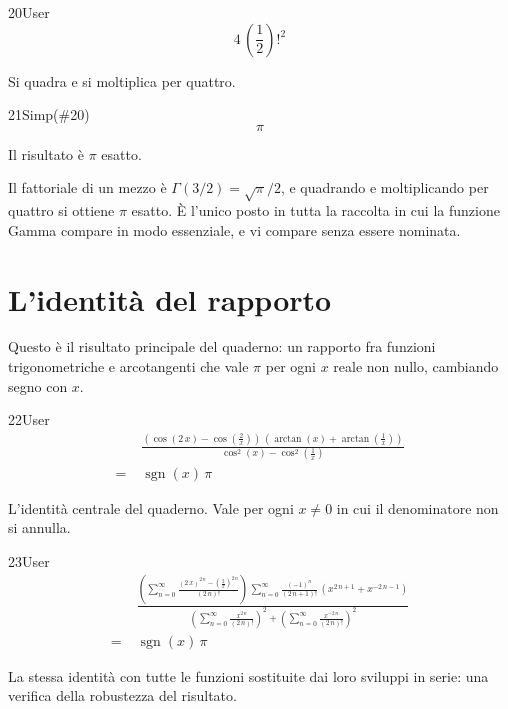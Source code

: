 \begin{espr}{20}{User}{}
\[
4\, \left(\frac{1}{2}\right)!^{2}
\]
\end{espr}
Si quadra e si moltiplica per quattro.

\begin{espr}{21}{Simp(\#20)}{}
\[
\pi
\]
\end{espr}
Il risultato è $\pi$ esatto.


Il fattoriale di un mezzo è $\Gamma(3/2)=\sqrt{\pi}/2$, e quadrando e moltiplicando per quattro si ottiene $\pi$ esatto. È l'unico posto in tutta la raccolta in cui la funzione Gamma compare in modo essenziale, e vi compare senza essere nominata.

\section{L'identità del rapporto}

Questo è il risultato principale del quaderno: un rapporto fra funzioni trigonometriche e arcotangenti che vale $\pi$ per ogni $x$ reale non nullo, cambiando segno con $x$.

\begin{espr}{22}{User}{}
\begin{align*}
& \frac{\left(\cos\!\left(2\, x\right) - \cos\!\left(\frac{2}{x}\right)\right)\, \left(\arctan\!\left(x\right) + \arctan\!\left(\frac{1}{x}\right)\right)}{\cos^{2}\!\left(x\right) - \cos^{2}\!\left(\frac{1}{x}\right)} \\
=\;& \operatorname{sgn}\!\left(x\right)\, \pi
\end{align*}
\end{espr}
L'identità centrale del quaderno. Vale per ogni $x\neq0$ in cui il denominatore non si annulla.

\begin{espr}{23}{User}{}
\begin{align*}
& \frac{\left(\sum_{n=0}^{\infty} \frac{\left(2\, x\right)^{2\, n} - \left(\frac{2}{x}\right)^{2\, n}}{\left(2\, n\right)!}\right)\, \sum_{n=0}^{\infty} \frac{\left(-1\right)^{n}}{\left(2\, n + 1\right)!}\, \left(x^{2\, n + 1} + x^{-2\, n - 1}\right)}{\left(\sum_{n=0}^{\infty} \frac{x^{2\, n}}{\left(2\, n\right)!}\right)^{2} + \left(\sum_{n=0}^{\infty} \frac{x^{-2\, n}}{\left(2\, n\right)!}\right)^{2}} \\
=\;& \operatorname{sgn}\!\left(x\right)\, \pi
\end{align*}
\end{espr}
La stessa identità con tutte le funzioni sostituite dai loro sviluppi in serie: una verifica della robustezza del risultato.

